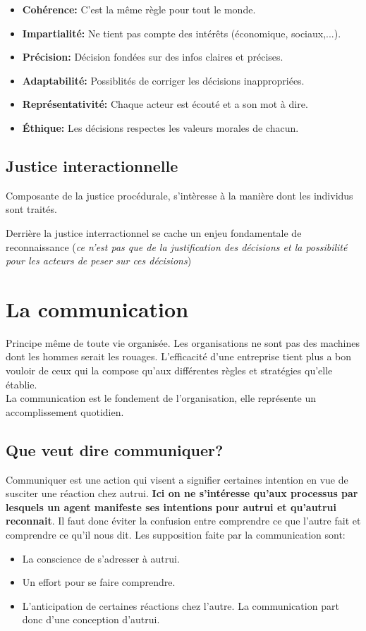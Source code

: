 \documentclass[11pt]{article} %
\begin{document}
\begin{itemize}
	\item \textbf{Cohérence:} C'est la même règle pour tout le monde.
	\item \textbf{Impartialité: } Ne tient pas compte des intérêts (économique, sociaux,...).
	\item \textbf{Précision: } Décision fondées sur des infos claires et précises.
	\item \textbf{Adaptabilité: } Possiblités de corriger les décisions inappropriées.
	\item \textbf{Représentativité: } Chaque acteur est écouté et a son mot à dire.
	\item \textbf{Éthique: } Les décisions respectes les valeurs morales de chacun.
\end{itemize}


\subsection{Justice interactionnelle}

Composante de la justice procédurale, s'intèresse à la manière dont les
individus sont traités.

Derrière la justice interractionnel se cache un enjeu fondamentale
de reconnaissance (\textit{ce n'est pas que de la justification des
décisions et la possibilité pour les acteurs de peser sur ces
décisions})


\section{La communication}
	Principe même de toute vie organisée. Les organisations ne sont pas des machines dont les hommes serait
	les rouages. L'efficacité d'une entreprise tient plus a bon vouloir de ceux qui la compose qu'aux différentes
	règles et stratégies qu'elle établie. \\
	La communication est le fondement de l'organisation, elle représente un accomplissement quotidien.




	\subsection{Que veut dire communiquer?}
		Communiquer est une action qui visent a signifier certaines intention en vue de susciter une réaction 
		chez autrui. \textbf{Ici on ne s'intéresse qu'aux processus par lesquels un agent manifeste ses 
		intentions pour autrui et qu'autrui reconnait}. Il faut donc éviter la confusion entre comprendre ce que 
		l'autre fait et comprendre ce qu'il nous dit. Les supposition faite par la communication sont:
		\begin{itemize}
			\item La conscience de s'adresser à autrui.
			\item Un effort pour se faire comprendre.
			\item L'anticipation de certaines réactions chez l'autre. La communication part donc d'une 
			conception d'autrui.
		\end{itemize}
\end{document}
